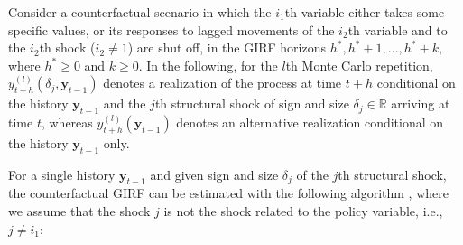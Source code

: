 \documentclass[nojss]{jss}
\begin{document}
Consider a counterfactual scenario in which the $i_1$th variable either takes some specific values, or its responses to lagged movements of the $i_2$th variable and to the $i_2$th shock ($i_2\neq 1$) are shut off, in the GIRF horizons $h^*, h^*+1,...,h^*+k$, where $h^*\geq 0$ and $k\geq 0$. In the following, for the $l$th Monte Carlo repetition, $y_{t+h}^{(l)}(\delta_j,\boldsymbol{y}_{t-1})$ denotes a realization of the process at time $t+h$ conditional on the history $\boldsymbol{y}_{t-1}$ and the $j$th structural shock of sign and size $\delta_j \in\mathbb{R}$ arriving at time $t$, whereas $y_{t+h}^{(l)}(\boldsymbol{y}_{t-1})$ denotes an alternative realization conditional on the history $\boldsymbol{y}_{t-1}$ only.

For a single history $\boldsymbol{y}_{t-1}$ and given sign and size $\delta_j$ of the $j$th structural shock, the counterfactual GIRF can be estimated with the following algorithm \citep[adapted from the GIRF algorithm in][Appendix~B]{Lanne+Virolainen:2024}, where we assume that the shock $j$ is not the shock related to the policy variable, i.e., $j\neq i_1$:
\end{document}

